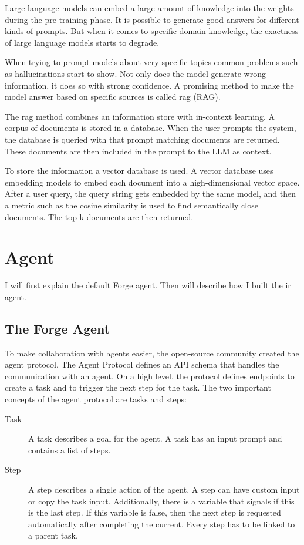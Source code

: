 \documentclass[../main.tex]{subfiles}
\begin{document}
Large language models can embed a large amount of knowledge into the weights during the pre-training phase.
It is possible to generate good answers for different kinds of prompts.
But when it comes to specific domain knowledge, the exactness of large language models starts to degrade.

When trying to prompt models about very specific topics common problems such as hallucinations start to show.
Not only does the model generate wrong information, it does so with strong confidence.
A promising method to make the model answer based on specific sources is called \gls{rag} (RAG).

The \gls{rag} method combines an information store with in-context learning.
A corpus of documents is stored in a database.
When the user prompts the system, the database is queried with that prompt matching documents are returned.
These documents are then included in the prompt to the LLM as context.

To store the information a vector database is used.
A vector database uses embedding models to embed each document into a high-dimensional vector space.
After a user query, the query string gets embedded by the same model,
and then a metric such as the cosine similarity is used to find semantically close documents.
The top-k documents are then returned.

\section{Agent}

I will first explain the default Forge agent.
Then will describe how I built the \gls{ir} agent.

\subsection{The Forge Agent}

To make collaboration with agents easier, the open-source community created the agent protocol.
The Agent Protocol defines an API schema that handles the communication with an agent.
On a high level, the protocol defines endpoints to create a task and to trigger the next step for the task.
The two important concepts of the agent protocol are tasks and steps:

\begin{description}
    \item[Task] A task describes a goal for the agent.
        A task has an input prompt and contains a list of steps.
    \item[Step] A step describes a single action of the agent.
        A step can have custom input or copy the task input.
        Additionally, there is a variable that signals if this is the last step.
        If this variable is false, then the next step is requested automatically after completing the current.
        Every step has to be linked to a parent task.
\end{description}
\end{document}
